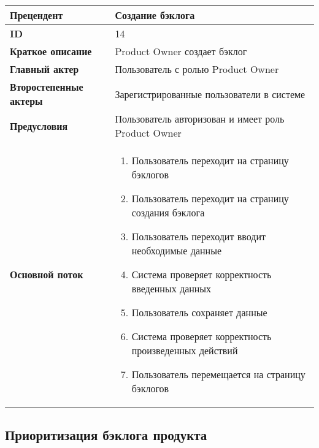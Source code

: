 \documentclass[14pt,a4paper]{extarticle}
\begin{document}
\begin{tabular}{|l|p{9cm}|}
	\hline
	\textbf{Прецендент}            & Создание бэклога                                           \\
	\hline
	\textbf{ID}                    & 14                                                         \\
	\hline
	\textbf{Краткое описание}      & Product Owner создает бэклог                               \\
	\hline
	\textbf{Главный актер}         & Пользователь с ролью Product Owner                         \\
	\hline
	\textbf{Второстепенные актеры} & Зарегистрированные пользователи в системе                  \\
	\hline
	\textbf{Предусловия}           & Пользователь авторизован и имеет роль Product Owner        \\
	\hline
	\textbf{Основной поток}        & \begin{enumerate}
		                                 \item Пользователь переходит на страницу бэклогов
		                                 \item Пользователь переходит на страницу создания бэклога
		                                 \item Пользователь переходит вводит необходимые данные
		                                 \item Система проверяет корректность введенных данных
		                                 \item Пользователь сохраняет данные
		                                 \item Система проверяет корректность произведенных действий
		                                 \item Пользователь перемещается на страницу бэклогов
	                                 \end{enumerate} \\
	\hline
\end{tabular}

\subsection{Приоритизация бэклога продукта}
\end{document}

